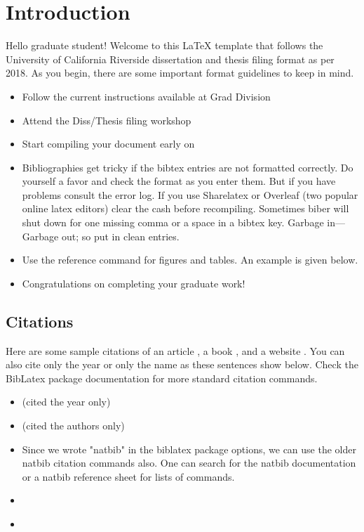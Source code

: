 \section{Introduction}

Hello graduate student! Welcome to this \LaTeX{} template that follows the University of California Riverside dissertation and thesis filing format as per 2018. As you begin, there are some important format guidelines to keep in mind.
    \begin{itemize}
        \item Follow the current instructions available at Grad Division
        \item Attend the Diss/Thesis filing workshop
        \item Start compiling your document early on
        \item Bibliographies get tricky if the bibtex entries are not formatted correctly. Do yourself a favor and check the format as you enter them. But if you have problems consult the error log. If you use Sharelatex or Overleaf (two popular online latex editors) clear the cash before recompiling. Sometimes biber will shut down for one missing comma or a space in a bibtex key. Garbage in---Garbage out; so put in clean entries.
        \item Use the reference command for figures and tables. An example is given below.
        \item Congratulations on completing your graduate work!
    \end{itemize}
    
\subsection{Citations}

Here are some sample citations of an article \parencite{ezcurra2016coastal}, a book \parencite{felger1985people}, and a website \parencite{pew2015internettime}. You can also cite only the year or only the name as these sentences show below. Check the BibLatex package documentation for more standard citation commands.
\begin{itemize}
    \item \citeyear{ezcurra2016coastal} (cited the year only)
    \item \citeauthor{felger1985people} (cited the authors only)
    \item Since we wrote "natbib" in the biblatex package options, we can use the older natbib citation commands also. One can search for the natbib documentation or a natbib reference sheet for lists of commands.
    \item \citet{ezcurra2016coastal}
    \item \citealp{felger1985people}
\end{itemize}

